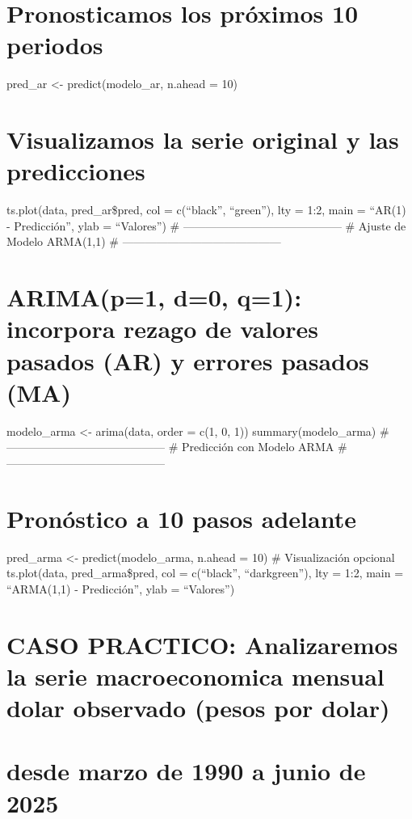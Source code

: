 \documentclass[
]{article}
\begin{document}
\section{Pronosticamos los próximos 10
periodos}\label{pronosticamos-los-pruxf3ximos-10-periodos}

pred\_ar \textless- predict(modelo\_ar, n.ahead = 10)

\section{Visualizamos la serie original y las
predicciones}\label{visualizamos-la-serie-original-y-las-predicciones}

ts.plot(data, pred\_ar\$pred, col = c(``black'', ``green''), lty = 1:2,
main = ``AR(1) - Predicción'', ylab = ``Valores'') \#
------------------------------------------ \# Ajuste de Modelo ARMA(1,1)
\# ------------------------------------------

\section{ARIMA(p=1, d=0, q=1): incorpora rezago de valores pasados (AR)
y errores pasados
(MA)}\label{arimap1-d0-q1-incorpora-rezago-de-valores-pasados-ar-y-errores-pasados-ma}

modelo\_arma \textless- arima(data, order = c(1, 0, 1))
summary(modelo\_arma) \# ------------------------------------------ \#
Predicción con Modelo ARMA \# ------------------------------------------

\section{Pronóstico a 10 pasos
adelante}\label{pronuxf3stico-a-10-pasos-adelante}

pred\_arma \textless- predict(modelo\_arma, n.ahead = 10) \#
Visualización opcional ts.plot(data, pred\_arma\$pred, col =
c(``black'', ``darkgreen''), lty = 1:2, main = ``ARMA(1,1) -
Predicción'', ylab = ``Valores'')

\section{CASO PRACTICO: Analizaremos la serie macroeconomica mensual
dolar observado (pesos por
dolar)}\label{caso-practico-analizaremos-la-serie-macroeconomica-mensual-dolar-observado-pesos-por-dolar}

\section{desde marzo de 1990 a junio de
2025}\label{desde-marzo-de-1990-a-junio-de-2025}
\end{document}
